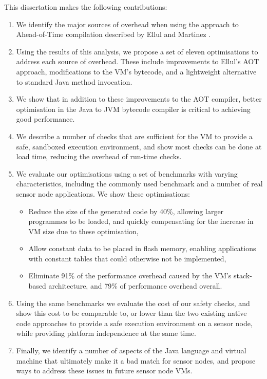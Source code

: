 \noindent
This dissertation makes the following contributions:
\begin{enumerate}
    \item We identify the major sources of overhead when using the approach to Ahead-of-Time compilation described by Ellul and Martinez \cite{Ellul:2010iw, Ellul:2012thesis}.
    \item Using the results of this analysis, we propose a set of eleven optimisations to address each source of overhead. These include improvements to Ellul's AOT approach, modifications to the VM's bytecode, and a lightweight alternative to standard Java method invocation.    
    \item We show that in addition to these improvements to the AOT compiler, better optimisation in the Java to JVM bytecode compiler is critical to achieving good performance.
    \item We describe a number of checks that are sufficient for the VM to provide a safe, sandboxed execution environment, and show most checks can be done at load time, reducing the overhead of run-time checks.
    \item We evaluate our optimisations using a set of benchmarks with varying characteristics, including the commonly used  benchmark \cite{coremark} and a number of real sensor node applications. We show these optimisations:
    \begin{itemize}
    	\item Reduce the size of the generated code by 40\%, allowing larger programmes to be loaded, and quickly compensating for the increase in VM size due to these optimisation, 
    	\item Allow constant data to be placed in flash memory, enabling applications with constant tables that could otherwise not be implemented,
    	\item Eliminate 91\% of the performance overhead caused by the VM's stack-based architecture, and 79\% of performance overhead overall.
    \end{itemize}
    \item Using the same benchmarks we evaluate the cost of our safety checks, and show this cost to be comparable to, or lower than the two existing native code approaches to provide a safe execution environment on a sensor node, while providing platform independence at the same time.
    \item Finally, we identify a number of aspects of the Java language and virtual machine that ultimately make it a bad match for sensor nodes, and propose ways to address these issues in future sensor node VMs.
\end{enumerate}


